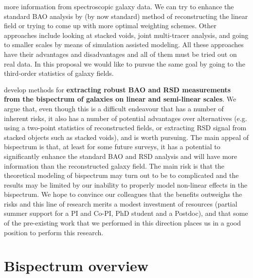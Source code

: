 more information from spectroscopic galaxy data. We can try to enhance the
standard BAO analysis by (by now standard) method of reconstructing the linear
field or trying to come up with more optimal weighting schemes. Other
approaches include looking at stacked voids, joint multi-tracer analysis, and
going to smaller scales by means of simulation assisted modeling. All these
approaches have their advantages and disadvantages and all of them must be
tried out on real data. In this proposal we would like to pursue the same goal
by going to the third-order statistics of galaxy fields.

develop methods for \textbf{extracting robust BAO and RSD measurements from
the  bispectrum of galaxies on linear and semi-linear scales}. We argue that,
even though this is a difficult  endeavour that has a number of inherent
risks, it also has a number of potential advantages over alternatives (e.g.
using a two-point statistics of reconstructed fields, or extracting RSD signal
from stacked objects such as stacked voids), and is worth pursuing. The main
appeal of bispectrum is that, at least for some future surveys, it has a
potential to significantly enhance the standard BAO and RSD analysis and will
have more information than the reconstructed galaxy field. The main risk is
that the theoretical modeling of bispectrum may turn out to be to complicated
and the results may be limited by our inability to properly model non-linear
effects in the bispectrum. We hope to convince our colleagues that the
benefits  outweighs the risks and this line of research merits a modest
investment of resources (partial summer support for a PI and Co-PI, PhD
student and a Postdoc), and that some of the pre-existing work that we
performed in this direction places us in a good position  to perform this
research. %

\section{Bispectrum overview}


